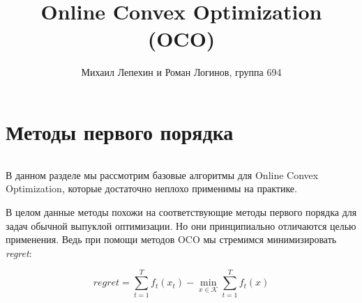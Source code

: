 \documentclass[12pt]{article}
\author{Михаил Лепехин и Роман Логинов, группа 694}
\title{Online Convex Optimization (OCO)}
\begin{document}
  \maketitle

\section*{Методы первого порядка}
$ $

В данном разделе мы рассмотрим базовые алгоритмы для Online Convex Optimization, которые достаточно неплохо применимы на практике.

В целом данные методы похожи на соответствующие методы первого порядка для задач обычной выпуклой оптимизации. Но они принципиально отличаются целью применения. Ведь при помощи методов OCO мы стремимся минимизировать \textit{regret}:

$$regret = \sum\limits_{t=1}^T f_t(x_t) - \min\limits_{x \in \mathcal{K}} \sum\limits_{t=1}^T f_t(x)$$
\end{document}

